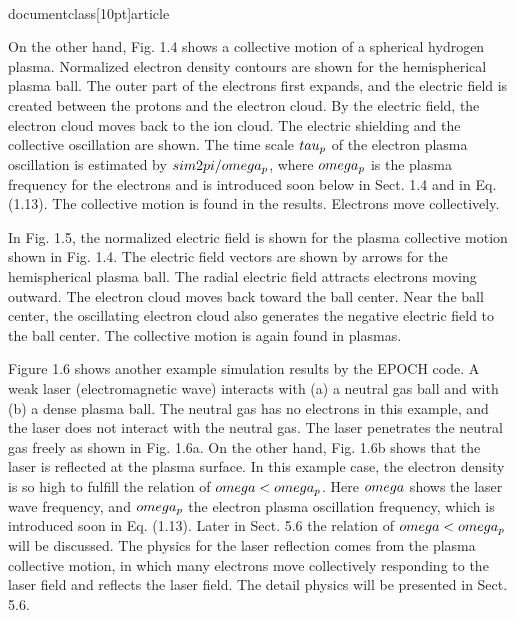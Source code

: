 \\documentclass[10pt]{article}
\begin{document}
On the other hand, Fig. 1.4 shows a collective motion of a spherical hydrogen plasma. Normalized electron density contours are shown for the hemispherical plasma ball. The outer part of the electrons first expands, and the electric field is created between the protons and the electron cloud. By the electric field, the electron cloud moves back to the ion cloud. The electric shielding and the collective oscillation are shown. The time scale $\\tau_{p}$ of the electron plasma oscillation is estimated by $\\sim 2 \\pi / \\omega_{p}$, where $\\omega_{p}$ is the plasma frequency for the electrons and is introduced soon below in Sect. 1.4 and in Eq. (1.13). The collective motion is found in the results. Electrons move collectively.

In Fig. 1.5, the normalized electric field is shown for the plasma collective motion shown in Fig. 1.4. The electric field vectors are shown by arrows for the hemispherical plasma ball. The radial electric field attracts electrons moving outward. The electron cloud moves back toward the ball center. Near the ball center, the oscillating electron cloud also generates the negative electric field to the ball center. The collective motion is again found in plasmas.

Figure 1.6 shows another example simulation results by the EPOCH code. A weak laser (electromagnetic wave) interacts with (a) a neutral gas ball and with (b) a dense plasma ball. The neutral gas has no electrons in this example, and the laser does not interact with the neutral gas. The laser penetrates the neutral gas freely as shown in Fig. 1.6a. On the other hand, Fig. 1.6b shows that the laser is reflected at the plasma surface. In this example case, the electron density is so high to fulfill the relation of $\\omega<\\omega_{p}$. Here $\\omega$ shows the laser wave frequency, and $\\omega_{p}$ the electron plasma oscillation frequency, which is introduced soon in Eq. (1.13). Later in Sect. 5.6 the relation of $\\omega<\\omega_{p}$ will be discussed. The physics for the laser reflection comes from the plasma collective motion, in which many electrons move collectively responding to the laser field and reflects the laser field. The detail physics will be presented in Sect. 5.6.
\end{document}
